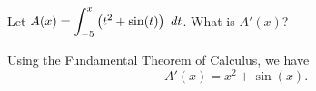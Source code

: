 \begin{example} %
Let $\displaystyle A(x) = \int_{-5}^x  \left( t^2 + \sin(t) \right) \ dt$.  What is $A'(x)$?

\solution Using the Fundamental Theorem of Calculus, we have 
\[ A'(x) = x^2 + \sin(x). \]
\end{example}